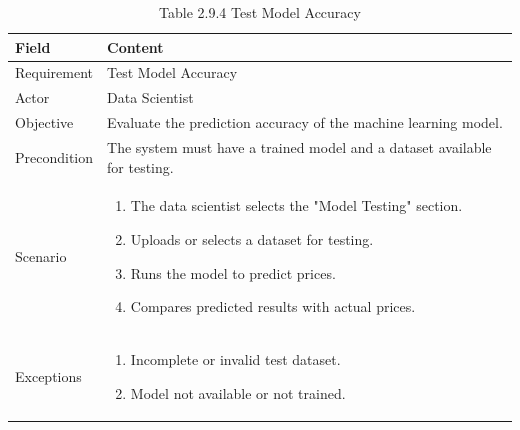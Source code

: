 \documentclass[12pt,oneside]{report}
\begin{document}
\begin{table}[H]
\centering
\caption{Table 2.9.4 Test Model Accuracy}
\label{tab:ds-test-model}
\begin{tabularx}{\textwidth}{|p{3cm}|X|}
\hline
\textbf{Field} & \textbf{Content} \\ \hline

Requirement & Test Model Accuracy \\ \hline

Actor & Data Scientist \\ \hline

Objective & Evaluate the prediction accuracy of the machine learning model. \\ \hline

Precondition & The system must have a trained model and a dataset available for testing. \\ \hline

Scenario &
\begin{minipage}[t]{0.75\textwidth}
\begin{enumerate}[leftmargin=*,label=\arabic*.]
\item The data scientist selects the "Model Testing" section.
\item Uploads or selects a dataset for testing.
\item Runs the model to predict prices.
\item Compares predicted results with actual prices.
\end{enumerate}
\end{minipage} \\ \hline

Exceptions &
\begin{minipage}[t]{0.75\textwidth}
\begin{enumerate}[leftmargin=*,label=\arabic*.]
\item Incomplete or invalid test dataset.
\item Model not available or not trained.
\end{enumerate}
\end{minipage} \\ \hline

\end{tabularx}
\end{table}
\end{document}
